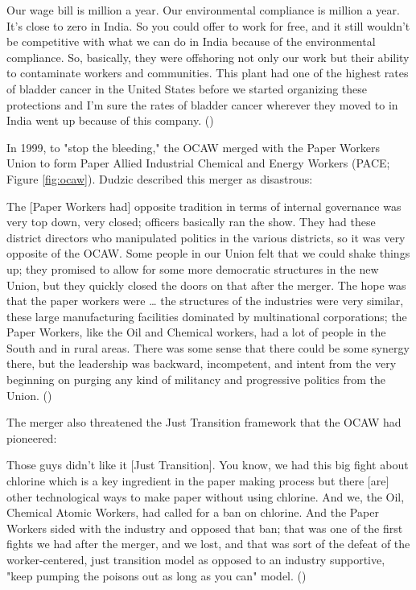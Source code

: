 \documentclass[12pt]{article}
\renewenvironment{quote}
  {\list{}{\leftmargin=\parindent\rightmargin=0pt}%
   \item\relax}
  {\endlist}
\begin{document}
\begin{quote}
Our wage bill is  million a year. Our environmental compliance is  million a year. It's close to zero in India. So you could offer to work for free, and it still wouldn't be competitive with what we can do in India because of the environmental compliance. So, basically, they were offshoring not only our work but their ability to contaminate workers and communities. This plant had one of the highest rates of bladder cancer in the United States before we started organizing these protections and I'm sure the rates of bladder cancer wherever they moved to in India went up because of this company. (\citeyear{dudzicInterview2024})
\end{quote}

In 1999, to "stop the bleeding," the OCAW merged with the Paper Workers Union to form Paper Allied Industrial Chemical and Energy Workers (PACE; Figure \ref{fig:ocaw}). Dudzic described this merger as disastrous:

\begin{quote}
The [Paper Workers had] opposite tradition in terms of internal governance was very top down, very closed; officers basically ran the show. They had these district directors who manipulated politics in the various districts, so it was very opposite of the OCAW. Some people in our Union felt that we could shake things up; they promised to allow for some more democratic structures in the new Union, but they quickly closed the doors on that after the merger. The hope was that the paper workers were … the structures of the industries were very similar, these large manufacturing facilities dominated by multinational corporations; the Paper Workers, like the Oil and Chemical workers, had a lot of people in the South and in rural areas. There was some sense that there could be some synergy there, but the leadership was backward, incompetent, and intent from the very beginning on purging any kind of militancy and progressive politics from the Union. (\citeyear{dudzicInterview2024})
\end{quote}

The merger also threatened the Just Transition framework that the OCAW had pioneered:

\begin{quote}
Those guys didn't like it [Just Transition]. You know, we had this big fight about chlorine which is a key ingredient in the paper making process but there [are] other technological ways to make paper without using chlorine. And we, the Oil, Chemical Atomic Workers, had called for a ban on chlorine. And the Paper Workers sided with the industry and opposed that ban; that was one of the first fights we had after the merger, and we lost, and that was sort of the defeat of the worker-centered, just transition model as opposed to an industry supportive, "keep pumping the poisons out as long as you can" model. (\citeyear{dudzicInterview2024})
\end{quote}
\end{document}
